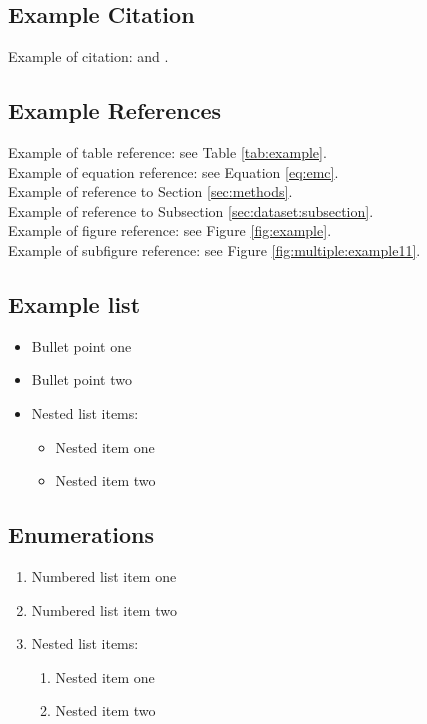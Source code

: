 \subsection*{Example Citation}
Example of citation: \cite{Smith_2013} and \cite{Smith_2012}. 


\subsection*{Example References}
Example of table reference: see Table \ref{tab:example}. \\
Example of equation reference: see Equation \eqref{eq:emc}. \\
Example of reference to Section \ref{sec:methods}. \\
Example of reference to Subsection \ref{sec:dataset:subsection}. \\
Example of figure reference: see Figure \ref{fig:example}.\\
Example of subfigure reference: see Figure \ref{fig:multiple:example11}.\\


\subsection*{Example list}
\begin{itemize}
\item Bullet point one
\item Bullet point two
\item Nested list items:
\begin{itemize}
\item Nested item one
\item Nested item two
\end{itemize}
\end{itemize}

\subsection*{Enumerations}
\begin{enumerate}
\item Numbered list item one
\item Numbered list item two
\item Nested list items:
\begin{enumerate}
\item Nested item one
\item Nested item two
\end{enumerate}
\end{enumerate}


